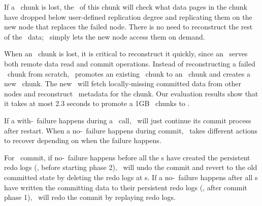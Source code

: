 If a \dn\ chunk is lost, 
the \on\ of this chunk will check what data pages in the chunk
have dropped below user-defined replication degree
and replicating them on the new node that replaces the failed node. 
There is no need to reconstruct the rest of the \dn\ data;
\hotpot\ simply lets the new node access them on demand.

When an \on\ chunk is lost, it is critical to reconstruct it quickly,
since an \on\ serves both remote data read and 
commit operations.
Instead of reconstructing a failed \on\ chunk from scratch,
\hotpot\ promotes an existing \dn\ chunk to an \on\ chunk
and creates a new \dn\ chunk.
The new \on\ will fetch locally-missing committed data from other nodes
and reconstruct \on\ metadata for the chunk.
Our evaluation results show that it takes at most 2.3 seconds to promote
a 1GB \dn\ chunks to \on.

If a with-\nvm\ failure happens during a \commitxact\ call,
\hotpot\ will just continue its commit process after restart.
When a no-\nvm\ failure happens during commit,
\hotpot\ takes different actions to recover depending on when the failure happens.

For \mrmw\ commit, if no-\nvm\ failure happens before all the \on{}s have created the persistent redo logs (\ie, before starting phase 2),
\hotpot\ will undo the commit and revert to the old committed state
by deleting the redo logs at \on{}s.
If a no-\nvm\ failure happens after all \on{}s have written the committing data to their persistent redo logs (\ie, after commit phase 1),
\hotpot\ will redo the commit by replaying redo logs.

